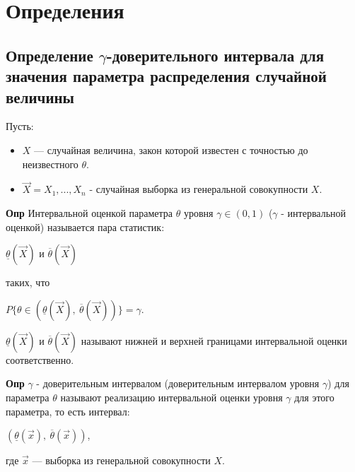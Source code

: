 \chapter{Определения}

\section*{Определение $\gamma$-доверительного интервала для значения параметра распределения случайной величины}

Пусть:

\begin{itemize}[label=]
    \item $X$ --- случайная величина, закон которой известен с точностью до неизвестного $\theta$.
    \item $\vec X = X_1,...,X_n$ - случайная выборка из генеральной совокупности $X$.
\end{itemize}

\textbf{Опр} Интервальной оценкой параметра $\theta$ уровня $\gamma \in (0, 1)$ ($\gamma$ - интервальной оценкой) называется пара статистик:

\begin{center}
	$\underline{\theta} (\vec X)$ и $\overline{\theta} (\vec X)$ 
\end{center}
    таких, что
\begin{center}
    $P \{\theta \in (\underline{\theta} (\vec X), \ \overline{\theta} (\vec X))\} = \gamma$.
\end{center}

$\underline{\theta} (\vec X)$ и $\overline{\theta} (\vec X)$ называют нижней и верхней границами интервальной оценки соответственно.

\textbf{Опр} $\gamma$ - доверительным интервалом (доверительным интервалом уровня $\gamma$) для параметра $\theta$ называют реализацию интервальной оценки уровня $\gamma$ для этого параметра, то есть интервал:

\begin{center}
	$(\underline{\theta} (\vec x), \ \overline{\theta} (\vec x))$,
\end{center}

где $\vec x$ --- выборка из генеральной совокупности $X$.